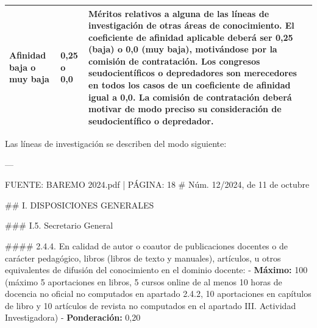 \documentclass{article}
\begin{document}
\begin{itemize}
\begin{itemize}
\begin{scriptsize}
\begin{table}[h!]
\begin{tabular}{|p{}|p{}|p{}|}
                      Afinidad baja o muy baja & 0,25 o 0,0  & Méritos relativos a alguna de las líneas de investigación de otras áreas de conocimiento. El coeficiente de afinidad aplicable deberá ser 0,25 (baja) o 0,0 (muy baja), motivándose por la comisión de contratación. Los congresos seudocientíficos o depredadores son merecedores en todos los casos de un coeficiente de afinidad igual a 0,0. La comisión de contratación deberá motivar de modo preciso su consideración de seudocientífico o depredador. \\\hline
                    \end{tabular}\end{table}
                  \vspace{0.4cm}

                  Las líneas de investigación se describen del modo siguiente:

                  ---

                  FUENTE: BAREMO 2024.pdf | PÁGINA: 18
                  \# Núm. 12/2024, de 11 de octubre

                  \#\# I. DISPOSICIONES GENERALES

                  \#\#\# I.5. Secretario General

                  \#\#\#\# 2.4.4. En calidad de autor o coautor de publicaciones docentes o de carácter pedagógico, libros (libros de texto y manuales), artículos, u otros equivalentes de difusión del conocimiento en el dominio docente:
                  - \textbf{Máximo:} 100 (máximo 5 aportaciones en libros, 5 cursos online de al menos 10 horas de docencia no oficial no computados en apartado 2.4.2, 10 aportaciones en capítulos de libro y 10 artículos de revista no computados en el apartado III. Actividad Investigadora)
                  - \textbf{Ponderación:} 0,20


\end{scriptsize}
\end{itemize}
\end{itemize}
\end{document}
